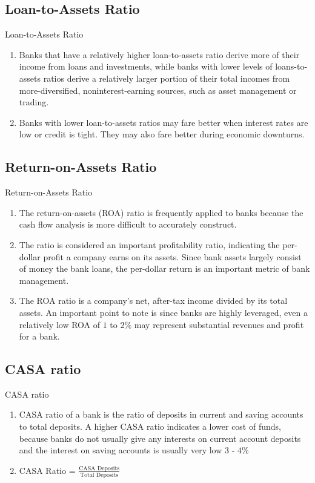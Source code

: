\documentclass{beamer}
\begin{document}
\subsection{Loan-to-Assets Ratio}
\begin{frame}{Loan-to-Assets Ratio}
		\begin{enumerate}
	\item Banks that have a relatively higher loan-to-assets ratio derive more of their income from loans and investments, while banks with lower levels of loans-to-assets ratios derive a relatively larger portion of their total incomes from more-diversified, noninterest-earning sources, such as asset management or trading. 
	\item Banks with lower loan-to-assets ratios may fare better when interest rates are low or credit is tight. They may also fare better during economic downturns.
	\end{enumerate}
\end{frame}

\subsection{Return-on-Assets Ratio}
\begin{frame}{Return-on-Assets Ratio}
		\begin{enumerate}
	\item The return-on-assets (ROA) ratio is frequently applied to banks because the cash flow analysis is more difficult to accurately construct. 
	\item The ratio is considered an important profitability ratio, indicating the per-dollar profit a company earns on its assets. Since bank assets largely consist of money the bank loans, the per-dollar return is an important metric of bank management. 
	\item The ROA ratio is a company's net, after-tax income divided by its total assets. An important point to note is since banks are highly leveraged, even a relatively low ROA of $1$ to $2\%$ may represent substantial revenues and profit for a bank.
	\end{enumerate}
\end{frame}

\subsection{CASA ratio}
\begin{frame}{CASA ratio}
		\begin{enumerate}
	\item CASA ratio of a bank is the ratio of deposits in current and saving accounts to total deposits. A higher CASA ratio indicates a lower cost of funds, because banks do not usually give any interests on current account deposits and the interest on saving accounts is usually very low $3$ - $4\%$
	\item CASA Ratio = $\frac{\text{CASA Deposits}}{\text{Total Deposits}}$
	\end{enumerate}
\end{frame}
\end{document}
